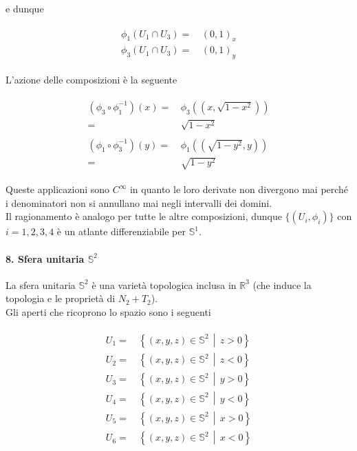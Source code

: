 e dunque

\begin{align}
	\begin{split}
		\phi_{1}(U_{1} \cap U_{3}) =& \, (0,1)_{x}\\
		\phi_{3}(U_{1} \cap U_{3}) =& \, (0,1)_{y}
	\end{split}
\end{align}

L'azione delle composizioni è la seguente

\begin{align}
	\begin{split}
		(\phi_{3} \circ \phi_{1}^{-1}) (x) =& \, \phi_{3} ((x,\sqrt{1-x^{2}}))\\
		=& \, \sqrt{1-x^{2}}\\\\
		(\phi_{1} \circ \phi_{3}^{-1}) (y) =& \, \phi_{1} ((\sqrt{1-y^{2}},y))\\
		=& \, \sqrt{1-y^{2}}
	\end{split}
\end{align}

Queste applicazioni sono $ C^{\infty} $ in quanto le loro derivate non divergono mai perché i denominatori non si annullano mai negli intervalli dei domini.\\
Il ragionamento è analogo per tutte le altre composizioni, dunque $ \{(U_{i},\phi_{i})\} $ con $ i=1,2,3,4 $ è un atlante differenziabile per $ \mathbb{S}^{1} $.

\paragraph{8. Sfera unitaria $ \mathbb{S}^{2} $}

La sfera unitaria $ \mathbb{S}^{2} $ è una varietà topologica inclusa in $ \mathbb{R}^{3} $ (che induce la topologia e le proprietà di $ N_{2}+T_{2} $).\\
Gli aperti che ricoprono lo spazio sono i seguenti

\begin{align}
	\begin{split}
		U_{1} =& \, \left\{ (x,y,z) \in \mathbb{S}^{2} \, \middle| \, z>0 \right\}\\
		U_{2} =& \, \left\{ (x,y,z) \in \mathbb{S}^{2} \, \middle| \, z<0 \right\}\\
		U_{3} =& \, \left\{ (x,y,z) \in \mathbb{S}^{2} \, \middle| \, y>0 \right\}\\
		U_{4} =& \, \left\{ (x,y,z) \in \mathbb{S}^{2} \, \middle| \, y<0 \right\}\\
		U_{5} =& \, \left\{ (x,y,z) \in \mathbb{S}^{2} \, \middle| \, x>0 \right\}\\
		U_{6} =& \, \left\{ (x,y,z) \in \mathbb{S}^{2} \, \middle| \, x<0 \right\}
	\end{split}	
\end{align}


